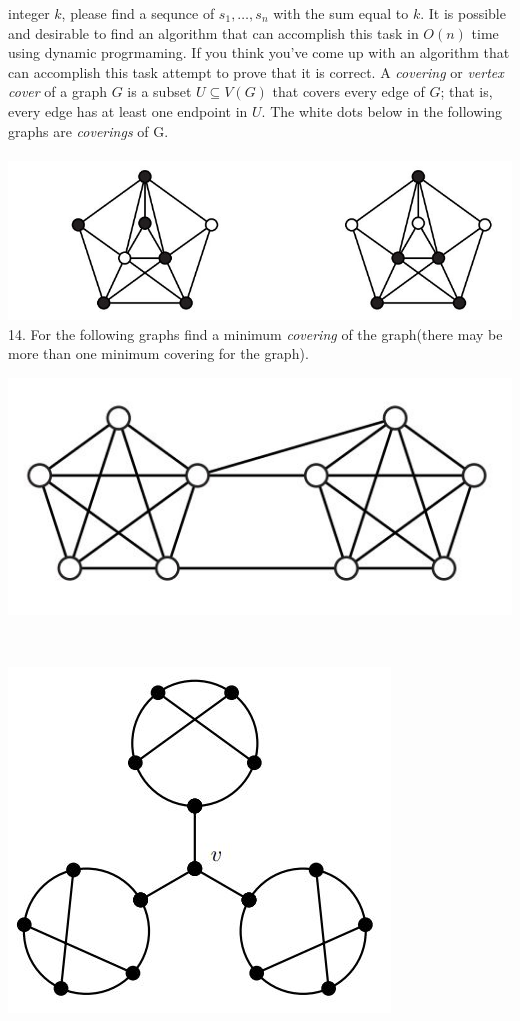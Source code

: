 \documentclass[12pt]{article}
\begin{document}
integer $k$, please find a sequnce of $s_1,\dots,s_n$ with the sum equal
to $k$. It is possible and desirable to find an algorithm that can accomplish this
task in $O(n)$ time using dynamic progrmaming. If you think you've come up with an
algorithm that can accomplish this task attempt to prove that it is correct.
\newpage
\noindent A \textit{covering} or \textit{vertex cover} of a graph $G$ is a subset $U ⊆ V(G)$ that covers every
edge of $G$; that is, every edge has at least one endpoint in $U$. The white dots below
in the following graphs are \textit{coverings} of G.\\\\
\includegraphics[width=\textwidth]{covering.jpg}\\
14. For the following graphs find a minimum \textit{covering} of the graph(there may
be more than one minimum covering for the graph).\\
\centerline{\includegraphics[scale=0.5]{graph2.jpg}}\\
\centerline{\includegraphics[scale=0.5]{graph1.jpg}}\\
\end{document}
